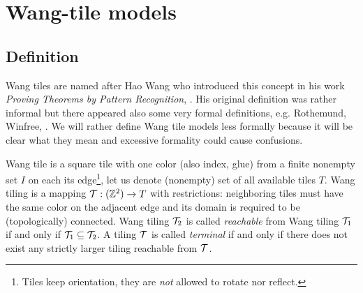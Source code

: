 \section{Wang-tile models}

\subsection{Definition}
	
	
	Wang tiles are named after Hao Wang who introduced this concept in his work {\em Proving Theorems by Pattern Recognition}, \cite{wang_tiles}. His original definition was rather informal but there appeared also some very formal definitions, e.g. Rothemund, Winfree, \cite{square_lb}. We will rather define Wang tile models less formally because it will be clear what they mean and excessive formality could cause confusions.
	
	Wang tile is a square tile with one color (also index, glue) from a finite nonempty set $I$ on each its edge\footnote{Tiles keep orientation, they are {\em not} allowed to rotate nor reflect.}, let us denote (nonempty) set of all available tiles $T$. Wang tiling is a mapping ${\cal T}: (\mathbb{Z}^2) \rightarrow T$ with restrictions: neighboring tiles must have the same color on the adjacent edge and its domain is required to be (topologically) connected. Wang tiling ${\cal T}_2$ is called {\em reachable} from Wang tiling ${\cal T}_1$ if and only if ${\cal T}_1 \subseteq {\cal T}_2$. A tiling $\cal T$ is called {\em terminal} if and only if there does not exist any strictly larger tiling reachable from $\cal T$. %
	
